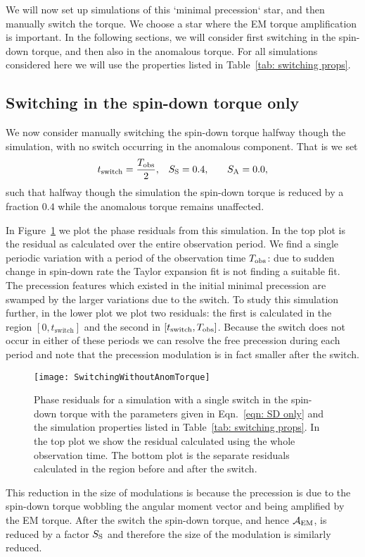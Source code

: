 \documentclass[../full_thesis/full_thesis.tex]{subfiles}
\begin{document}
We will now set up simulations of this `minimal precession` star, and then
manually switch the torque. We choose a star where the EM torque amplification is
important.  In the following sections, we will consider first switching in the
spin-down torque, and then also in the anomalous torque. For all simulations
considered here we will use the properties listed in Table~\ref{tab: switching
props}.

\subsection{Switching in the spin-down torque only}
We now consider manually switching the spin-down torque halfway though the
simulation, with no switch occurring in the anomalous component.
That is we set
\begin{align}
    t_{\mathrm{switch}} = \frac{T_{\mathrm{obs}}}{2}, &&& S_{\mathrm{S}} = 0.4, &&& S_{\mathrm{A}} = 0.0,
\label{eqn: SD only}
\end{align}
such that halfway though the simulation the spin-down torque is reduced by a
fraction $0.4$ while the anomalous torque remains unaffected.

In Figure~\ref{fig: switching without anom} we plot the phase residuals from
this simulation. In the top plot is the residual as calculated over the entire
observation period. We find a single periodic variation with a period of the
observation time $T_{\mathrm{obs}}$: due to sudden change in spin-down rate the Taylor
expansion fit is not finding a suitable fit. The precession features which
existed in the initial minimal precession are swamped by the larger variations
due to the switch. To study this simulation further, in the lower plot we plot
two residuals: the first is calculated in the region $[0, t_{\mathrm{switch}}]$
and the second in $[t_{\mathrm{switch}}, T_{\mathrm{obs}}]$. Because the switch does not
occur in either of these periods we can resolve the free precession during each
period and note that the precession modulation is in fact smaller after the
switch.
\begin{figure}[htb]
\texttt{[image: SwitchingWithoutAnomTorque]}
\caption{Phase residuals for a simulation with a single switch in the spin-down
torque with the parameters given in Eqn.~\eqref{eqn: SD only} and the
simulation properties listed in Table~\ref{tab: switching props}. In the top
plot we show the residual calculated using the whole observation time. The
bottom plot is the separate residuals calculated in the region before and after
the switch.}
\label{fig: switching without anom}
\end{figure}
This reduction in the size of modulations is because the precession is due to
the spin-down torque wobbling the angular moment vector and being amplified by
the EM torque. After the switch the spin-down torque, and hence $\mathcal{A}_{\mathrm{EM}}$, is
reduced by a factor $S_{\mathrm{S}}$ and therefore the size of the modulation is similarly
reduced.
\end{document}
